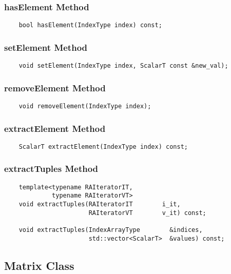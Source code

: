 \subsubsection{{\sf hasElement} Method}
\begin{verbatim}
    bool hasElement(IndexType index) const;
\end{verbatim}

\subsubsection{{\sf setElement} Method}
\begin{verbatim}
    void setElement(IndexType index, ScalarT const &new_val);
\end{verbatim}

\subsubsection{{\sf removeElement} Method}
\begin{verbatim}
    void removeElement(IndexType index);
\end{verbatim}

\subsubsection{{\sf extractElement} Method}
\begin{verbatim}
    ScalarT extractElement(IndexType index) const;
\end{verbatim}


\subsubsection{{\sf extractTuples} Method}
\begin{verbatim}
    template<typename RAIteratorIT,
             typename RAIteratorVT>
    void extractTuples(RAIteratorIT        i_it,
                       RAIteratorVT        v_it) const;

    void extractTuples(IndexArrayType        &indices,
                       std::vector<ScalarT>  &values) const;
\end{verbatim}


\subsection{Matrix Class}

